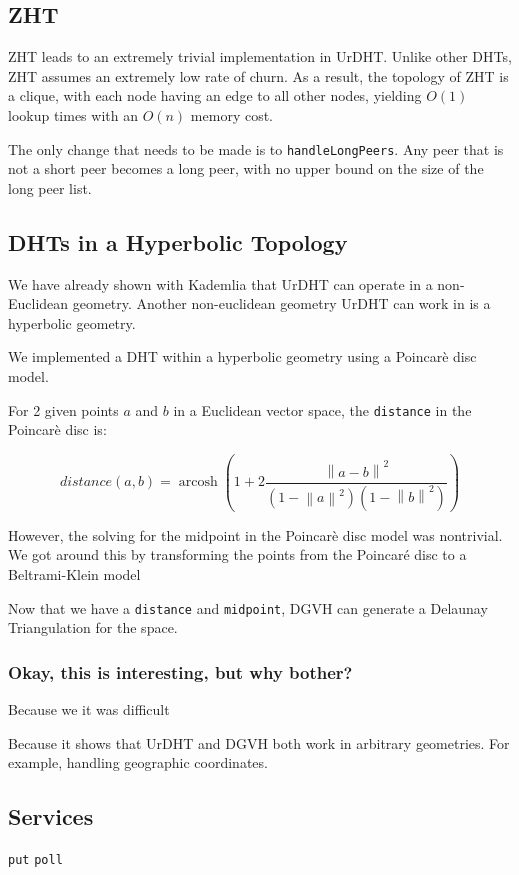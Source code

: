 \documentclass[11pt,conference]{IEEEtran}
\begin{document}
\subsection{ZHT}
ZHT \cite{li2013zht} leads to an extremely trivial implementation in UrDHT.
Unlike other DHTs, ZHT assumes an extremely low rate of churn.
As a result, the topology of ZHT is a clique, with each node having an edge to all other nodes, yielding $ O(1) $ lookup times with an $ O(n) $ memory cost.

The only change that needs to be made is to \texttt{handleLongPeers}.
Any peer that is not a short peer becomes a long peer, with no upper bound on the size of the long peer list.
\subsection{DHTs in a Hyperbolic Topology}
	
\label{sec:hyper}

We have already shown with Kademlia that UrDHT can operate in a non-Euclidean geometry.
Another non-euclidean geometry UrDHT can work in is a hyperbolic geometry.

We implemented a DHT within a hyperbolic geometry using a Poincar\`{e} disc model.

For 2 given points $a$ and $b$ in a Euclidean vector space, the \texttt{distance} in the  Poincar\`{e} disc is:


\[ distance(a, b) = \operatorname{arcosh} \left(  1+ 2 \frac{ \left\| a - b \right\| ^{2} }{ ( 1 - \left\| a \right\| ^{2} ) ( 1 - \left\| b \right\| ^{2} ) }\right) \]


However, the solving for the midpoint in the Poincar\`{e} disc model was nontrivial.
We got around this by transforming the points from the Poincar\'{e} disc to a Beltrami-Klein model

Now that we have a \texttt{distance} and \texttt{midpoint}, DGVH can generate a Delaunay Triangulation for the space.


\subsubsection{Okay, this is interesting, but why bother?}
Because we it was difficult

Because it shows that UrDHT and DGVH both work in arbitrary geometries.
For example, handling geographic coordinates. 


\subsection{Services}
\texttt{put}  \texttt{poll}
	
\end{document}
